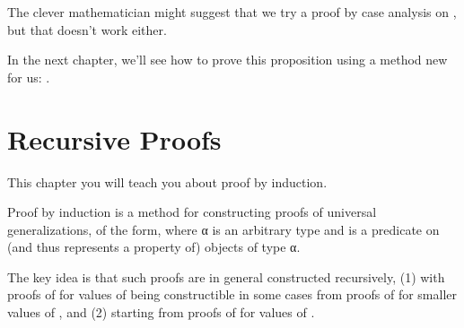 \documentclass[letterpaper,10pt,english]{sphinxmanual}
\begin{document}
\sphinxAtStartPar
The clever mathematician might suggest that we try a
proof by case analysis on , but that doesn’t work
either.

\begin{sphinxVerbatim}[commandchars=\\\{\}]
           
 
     
 \PYG{o}{[}\PYG{o}{]}   
\end{sphinxVerbatim}

\sphinxAtStartPar
In the next chapter, we’ll see how to prove this
proposition using a method new for us: .


\section{Recursive Proofs}
\label{\detokenize{A_03_Recursive_Types:recursive-proofs}}
\sphinxAtStartPar
This chapter you will teach you about proof by induction.

\sphinxAtStartPar
Proof by induction is a method for constructing proofs of
universal generalizations, of the form, 
where α is an arbitrary type and  is a predicate on (and
thus represents a property of) objects of type α.

\sphinxAtStartPar
The key idea is that such proofs are in general constructed
recursively, (1) with proofs of  for  values of
 being constructible in some cases from proofs of 
for  smaller values of , and (2) starting from proofs of
 for  values of .
\end{document}
